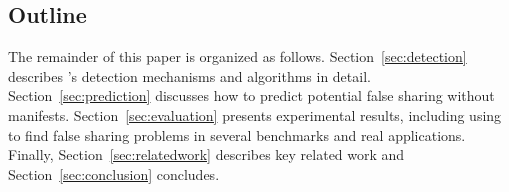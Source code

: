 \subsection*{Outline}

The remainder of this paper is organized as follows. 
Section~\ref{sec:detection} describes 's detection mechanisms and
algorithms in detail.
Section~\ref{sec:prediction} discusses how to predict potential false sharing without manifests. 
Section~\ref{sec:evaluation} presents experimental results, including using  to find 
false sharing problems in several benchmarks and real applications. 
Finally, 
Section~\ref{sec:relatedwork} describes key related work and Section~\ref{sec:conclusion} concludes.


